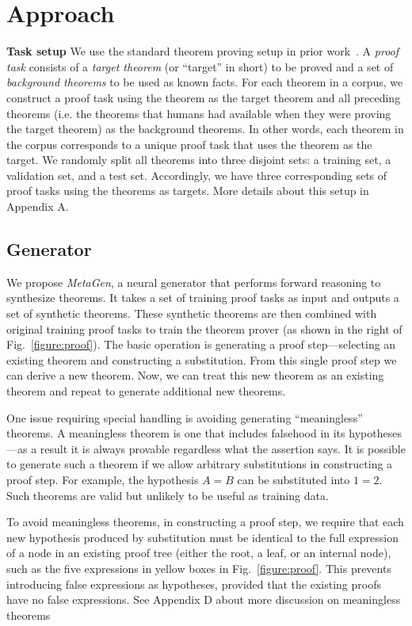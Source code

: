 \documentclass{article}
\begin{document}
\section{Approach}
\noindent\textbf{Task setup}
We use the standard theorem proving setup in prior work~\cite{irving2016deepmath,bansal2019holist, whalen2016holophrasm}. A \emph{proof task} consists of a \emph{target theorem} (or ``target'' in short) to be proved and a set of \emph{background theorems} to be used as known facts. 
For each theorem in a corpus, we construct a proof task using the theorem as the target theorem and all preceding theorems (i.e. the theorems that humans had available when they were proving the target theorem) as the background theorems. In other words, each theorem in the corpus corresponds to a unique proof task that uses the theorem as the target.  We randomly split all theorems into three disjoint sets: a training set, a validation set, and a test set. Accordingly, we have three corresponding sets of proof tasks using the theorems as targets. More details about this setup in Appendix A.   

\subsection{Generator}
\label{sec:gen}

We propose \emph{MetaGen}, a neural generator that performs forward reasoning to  synthesize theorems. 
It takes a set of training proof tasks as input and outputs a set of synthetic theorems. These synthetic theorems are then combined with original training proof tasks to train the theorem prover (as shown in the right of Fig.~\ref{figure:proof}). The basic operation is generating a proof step---selecting an existing theorem and constructing a substitution. From this single proof step we can derive a new theorem. Now, we can treat this new theorem as an existing theorem and repeat to generate additional new theorems. 

One issue requiring special handling is avoiding generating ``meaningless'' theorems. A meaningless theorem is one that includes falsehood in its hypotheses---as a result it is always provable regardless what the assertion says. It is possible to generate such a theorem if we allow arbitrary substitutions in constructing a proof step. For example, the hypothesis $A=B$ can be substituted into 
$1=2$. Such theorems are valid but unlikely to be useful as training data. 

To avoid meaningless theorems, in constructing a proof step, we require that each new hypothesis produced by substitution must be identical to the full expression of a node in an existing proof tree  (either the root, a leaf, or an internal node), such as the five expressions in yellow boxes in Fig.~\ref{figure:proof}. This prevents introducing false expressions as hypotheses, provided that the existing proofs have no false expressions. See Appendix D about more discussion on meaningless theorems 
\end{document}
